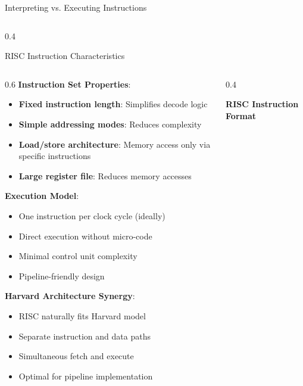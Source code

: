 \documentclass[aspectratio=169]{beamer}
\newcommand{\concept}[1]{\textbf{\color{darkblue}#1}}
\begin{document}
\begin{frame}{Interpreting vs. Executing Instructions}
\begin{columns}
\begin{column}{0.4\textwidth}
\begin{center}
\begin{frame}{RISC Instruction Characteristics}
\begin{columns}
\begin{column}{0.6\textwidth}
\concept{Instruction Set Properties}:
\begin{itemize}
\item \textbf{Fixed instruction length}: Simplifies decode logic
\item \textbf{Simple addressing modes}: Reduces complexity
\item \textbf{Load/store architecture}: Memory access only via specific instructions
\item \textbf{Large register file}: Reduces memory accesses
\end{itemize}

\vspace{0.3cm}
\concept{Execution Model}:
\begin{itemize}
\item One instruction per clock cycle (ideally)
\item Direct execution without micro-code
\item Minimal control unit complexity
\item Pipeline-friendly design
\end{itemize}

\vspace{0.3cm}
\concept{Harvard Architecture Synergy}:
\begin{itemize}
\item RISC naturally fits Harvard model
\item Separate instruction and data paths
\item Simultaneous fetch and execute
\item Optimal for pipeline implementation
\end{itemize}
\end{column}
\begin{column}{0.4\textwidth}
\begin{center}
\textbf{RISC Instruction Format}
\vspace{0.3cm}

\end{center}
\end{column}
\end{columns}
\end{frame}
\end{center}
\end{column}
\end{columns}
\end{frame}
\end{document}
